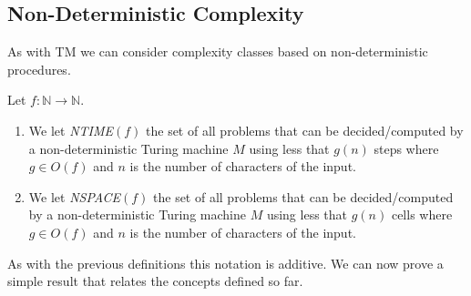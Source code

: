 \subsection{Non-Deterministic Complexity}

As with TM we can consider complexity classes based on non-deterministic procedures.

\begin{definition}
  Let $f: \mathbb{N}\to  \mathbb{N}$.
\begin{enumerate}
  \item We let \emph{NTIME}$(f)$  the set of all problems that can be decided/computed by a non-deterministic Turing machine $M$ using less that $g(n)$ steps where $g\in O(f)$ and $n$ is the number of characters of the input.  
  \item We let \emph{NSPACE}$(f)$  the set of all problems that can be decided/computed by a non-deterministic Turing machine $M$ using less that $g(n)$ cells where $g\in O(f)$ and $n$ is the number of characters of the input.  
\end{enumerate}
\end{definition}
  
As with the previous definitions this notation is additive. We can now prove a simple result that relates the concepts defined so far.

